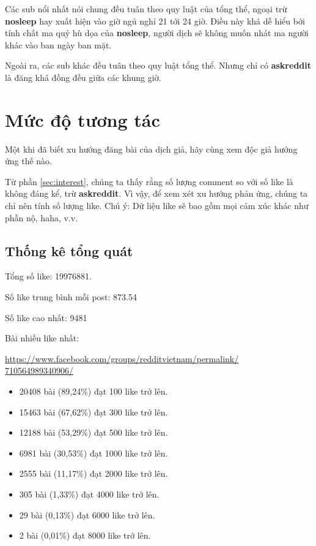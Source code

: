 \documentclass[10pt,a4paper]{article}
\begin{document}
Các sub nổi nhất nói chung đều tuân theo quy luật của tổng thể, ngoại trừ \textbf{nosleep} hay xuất hiện vào giờ ngủ nghỉ 21 tới 24 giờ. Điều này khá dễ hiểu bởi tính chất ma quỷ hù dọa của \textbf{nosleep}, người dịch sẽ không muốn nhát ma người khác vào ban ngày ban mặt.

Ngoài ra, các sub khác đều tuân theo quy luật tổng thể. Nhưng chỉ có \textbf{askreddit} là đăng khá đồng đều giữa các khung giờ.

\section{Mức độ tương tác}
Một khi đã biết xu hướng đăng bài của dịch giả, hãy cùng xem độc giả hưởng ứng thế nào.

Từ phần \eqref{sec:interest}, chúng ta thấy rằng số lượng comment so với số like là không đáng kể, trừ \textbf{askreddit}. Vì vậy, để xem xét xu hướng phản ứng, chúng ta chỉ nên tính số lượng like. Chú ý: Dữ liệu like sẽ bao gồm mọi cảm xúc khác như phẫn nộ, haha, v.v.

\subsection{Thống kê tổng quát}
Tổng số like: 19976881.

Số like trung bình mỗi post: 873.54

Số like cao nhất: 9481

Bài nhiều like nhất: 

\href{https://www.facebook.com/groups/redditvietnam/permalink/710564989340906/}{https://www.facebook.com/groups/redditvietnam/permalink/\\710564989340906/}

\begin{itemize}
    \item 20408 bài (89,24\%) đạt 100 like trở lên.
    \item 15463 bài (67,62\%) đạt 300 like trở lên.
    \item 12188 bài (53,29\%) đạt 500 like trở lên.
    \item 6981 bài (30,53\%) đạt 1000 like trở lên.
    \item 2555 bài (11,17\%) đạt 2000 like trở lên.
    \item 305 bài (1,33\%) đạt 4000 like trở lên.
    \item 29 bài (0,13\%) đạt 6000 like trở lên.
    \item 2 bài (0,01\%) đạt 8000 like trở lên.
\end{itemize}
\end{document}
